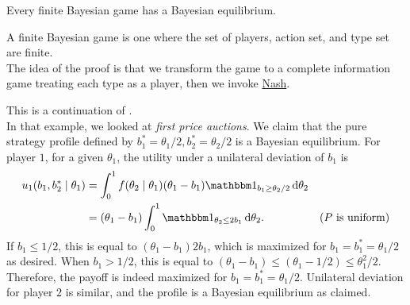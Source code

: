 	\begin{ftheo}
		Every finite Bayesian game has a Bayesian equilibrium.
	\end{ftheo}
	A finite Bayesian game is one where the set of players, action set, and type set are finite.\\
	The idea of the proof is that we transform the game to a complete information game treating each type as a player, then we invoke \hyperref[theo: msne exists]{Nash}.

	\begin{fex}
		This is a continuation of .\\
		In that example, we looked at \emph{first price auctions}. We claim that the pure strategy profile defined by $b_1^* = \theta_1/2, b_2^* = \theta_2/2$ is a Bayesian equilibrium.
		For player $1$, for a given $\theta_1$, the utility under a unilateral deviation of $b_1$ is
		\begin{align*}
			u_1(b_1,b_2^* \mid \theta_1) &= \int_0^1 f(\theta_2 \mid \theta_1) (\theta_1 - b_1) \indic_{b_1 \ge \theta_2/2} \dif \theta_2 \\
				&= (\theta_1 - b_1) \int_0^1 \indic_{\theta_2 \le 2b_1} \dif \theta_2. & \text{($P$ is uniform)}
		\end{align*}
		If $b_1 \le 1/2$, this is equal to $(\theta_1 - b_1)2b_1$, which is maximized for $b_1 = b_1^* = \theta_1/2$ as desired. When $b_1 > 1/2$, this is equal to $(\theta_1 - b_1) \le (\theta_1 - 1/2) \le \theta_1^2/2$.\\
		Therefore, the payoff is indeed maximized for $b_1 = b_1^* = \theta_1/2$. Unilateral deviation for player $2$ is similar, and the profile is a Bayesian equilibrium as claimed.
	\end{fex}

